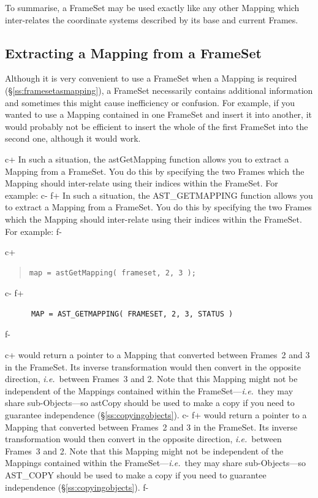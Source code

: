 \documentclass[twoside,11pt]{article}
\newcommand{\secref}[1]{\S\ref{#1}}
\newcommand{\secref}[1]{\ref{#1}}
\begin{document}
To summarise, a FrameSet may be used exactly like any other Mapping
which inter-relates the coordinate systems described by its base and
current Frames.

\subsection{\label{ss:extractingamapping}Extracting a Mapping from a FrameSet}

Although it is very convenient to use a FrameSet when a Mapping is
required (\secref{ss:framesetasmapping}), a FrameSet necessarily
contains additional information and sometimes this might cause
inefficiency or confusion.  For example, if you wanted to use a
Mapping contained in one FrameSet and insert it into another, it would
probably not be efficient to insert the whole of the first FrameSet
into the second one, although it would work.

c+
In such a situation, the astGetMapping function allows you to extract
a Mapping from a FrameSet. You do this by specifying the two Frames
which the Mapping should inter-relate using their indices within the
FrameSet. For example:
c-
f+
In such a situation, the AST\_GETMAPPING function allows you to
extract a Mapping from a FrameSet. You do this by specifying the two
Frames which the Mapping should inter-relate using their indices
within the FrameSet. For example:
f-

c+
\begin{quote}
\small
\begin{verbatim}
map = astGetMapping( frameset, 2, 3 );
\end{verbatim}
\normalsize
\end{quote}
c-
f+
\small
\begin{verbatim}
      MAP = AST_GETMAPPING( FRAMESET, 2, 3, STATUS )
\end{verbatim}
\normalsize
f-

c+
would return a pointer to a Mapping that converted between Frames~2
and 3 in the FrameSet. Its inverse transformation would then convert
in the opposite direction, {\em{i.e.}}\ between Frames~3 and 2.  Note
that this Mapping might not be independent of the Mappings contained
within the FrameSet---{\em{i.e.}}\ they may share sub-Objects---so
astCopy should be used to make a copy if you need to guarantee
independence (\secref{ss:copyingobjects}).
c-
f+
would return a pointer to a Mapping that converted between Frames~2
and 3 in the FrameSet. Its inverse transformation would then convert
in the opposite direction, {\em{i.e.}}\ between Frames~3 and 2.  Note
that this Mapping might not be independent of the Mappings contained
within the FrameSet---{\em{i.e.}}\ they may share sub-Objects---so
AST\_COPY should be used to make a copy if you need to guarantee
independence (\secref{ss:copyingobjects}).
f-
\end{document}
